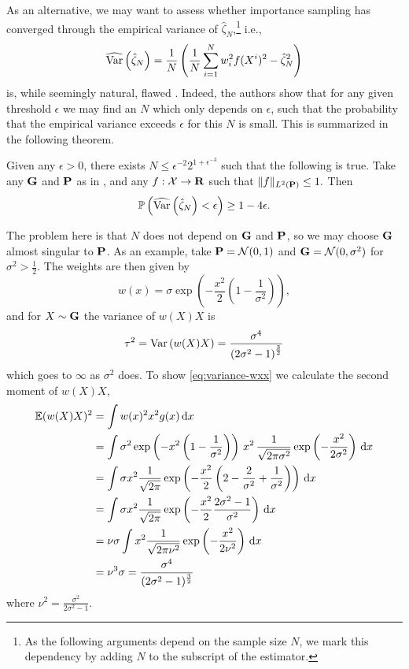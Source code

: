 As an alternative, we may want to assess whether importance sampling has converged through the empirical variance of $\hat \zeta_{N}$,\footnote{As the following arguments depend on the sample size $N$, we mark this dependency by adding $N$ to the subscript of the estimator.} i.e., 
$$
\widehat\var \left( \hat\zeta_{N} \right) = \frac{1}{N}\left(\frac{1}{N} \sum_{i = 1}^N w_{i}^{2} f(X^{i})^{2} - \hat \zeta_{N}^{2}\right)
$$
is, while seemingly natural, flawed \citep{Chatterjee2018Sample}.
Indeed, the authors show that for any given threshold $\epsilon$ we may find an $N$ which only depends on $\epsilon$, such that the probability that the empirical variance exceeds $\epsilon$ for this $N$ is small. This is summarized in the following theorem.

\begin{theorem}
    \label{thm:variance_failure}
    Given any $\epsilon > 0$, there exists $N \leq \epsilon^{-2} 2^{1 + \epsilon^{-3}}$ such that the following is true. Take any $\G$ and $\P$ as in , and any $f: \mathcal X \to \R$ such that $ \lVert f \rVert_{L^{2}(\P)} \leq 1.$ Then 
    $$
        \mathbb P \left( \widehat \var \left( \hat \zeta_{N} \right) < \epsilon\right) \geq 1 - 4 \epsilon.
    $$
\end{theorem}

The problem here is that $N$ does not depend on $\G$ and $\P$, so we may choose $\G$ almost singular to $\P$. As an example, take $\P = \mathcal N(0, 1)$ and $\G = \mathcal N(0, \sigma^{2})$ for $\sigma^{2} > \frac{1}{2}$. The weights are then given by $$w(x) = \sigma \exp \left( - \frac{x^{2}}{2} \left( 1 - \frac{1}{\sigma^{2}} \right) \right),$$
and for $X \sim \G$ the variance of $w(X)X$ is 
\begin{align}
    \label{eq:variance-wxx}
\tau^{2} = \var \left( w(X)X \right) = \frac{\sigma^{4}}{\left( 2 \sigma^{2} - 1 \right)^{\frac{3}{2}}}
\end{align}
which goes to $\infty$ as $\sigma^2$ does. To show \eqref{eq:variance-wxx} we calculate the second moment of $w(X)X$,
\begin{align*}
    \mathbb E (w(X)X)^{2} &= \int w(x)^{2} x^{2} g(x) \d x \\
    &= \int \sigma^{2} \exp \left( - x^{2} \left( 1 - \frac{1}{\sigma^{2}} \right)\right)\, x^{2}\, \frac{1}{\sqrt{2\pi\sigma^{2}}} \exp \left( -\frac{x^{2}}{2\sigma^{2}} \right)  \d x \\
    &= \int \sigma x^{2} \frac{1}{\sqrt{2\pi}}\exp \left( - \frac{x^{2}}{2} \left( 2 - \frac{2}{\sigma^{2}} + \frac{1}{\sigma^{2}} \right) \right)\d x \\
    &= \int \sigma x^{2} \frac{1}{\sqrt{2\pi}}\exp \left( - \frac{x^{2}}{2} \frac{2\sigma^{2} - 1}{\sigma^{2}} \right)\d x \\
    &= \nu \sigma \int x^{2} \frac{1}{\sqrt{2\pi\nu^{2}}} \exp \left( - \frac{x^{2}}{2\nu^{2}}\right)\d x \\
    &= \nu^{3} \sigma = \frac{\sigma^{4}}{(2\sigma^{2} - 1)^{\frac{3}{2}}}
\end{align*}
where $\nu^{2} = \frac{\sigma^{2}}{2\sigma^{2} - 1}$.

